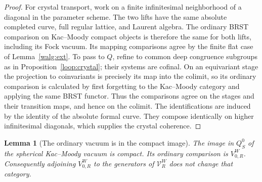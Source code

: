 \documentclass[11pt]{article}
\numberwithin{equation}{section}
\newtheorem{lemma}[theorem]{Lemma}
\theoremstyle{definition}
\theoremstyle{remark}
\begin{document}
\begin{proof}
For crystal transport, work on a finite infinitesimal neighborhood
of a diagonal in the parameter scheme.  The two lifts have the same
absolute completed curve, full regular lattice, and Laurent algebra.
The ordinary BRST comparison on Kac--Moody compact objects is
therefore the same for both lifts, including its Fock vacuum.
Its mapping comparisons agree by the finite flat case of
Lemma~\ref{walg:ext}.  To pass to \(Q\), refine to common deep
congruence subgroups as in Proposition~\ref{loop:crystal}; their
systems are cofinal.  On an equivariant stage the projection to
coinvariants is precisely its map into the colimit, so its ordinary
comparison is calculated by first forgetting to the Kac--Moody
category and applying the same BRST functor.  Thus the comparisons
agree on the stages and their transition maps, and hence on the
colimit.  The identifications are induced by the identity of the
absolute formal curve.  They compose identically on higher
infinitesimal diagonals, which supplies the crystal coherence.
\end{proof}

\begin{lemma}[The ordinary vacuum is in the compact image]
\label{walg:ordinary-vacuum}
The image in \(Q_S^0\) of the spherical Kac--Moody vacuum is compact.
Its ordinary comparison is \(V_{0,R}^W\).  Consequently adjoining
\(V_{0,R}^W\) to the generators of \(\mathcal V_R^W\) does not
change that category.
\end{lemma}
\end{document}

